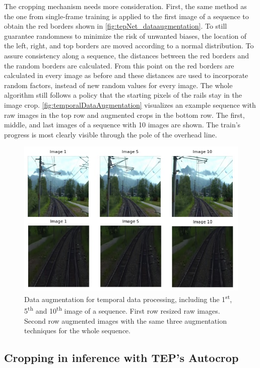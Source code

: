 The cropping mechanism needs more consideration.
First, the same method as the one from single-frame training is applied to the first image of a sequence to obtain the red borders shown in \autoref{fig:tepNet_dataaugmentation}.
To still guarantee randomness to minimize the risk of unwanted biases, the location of the left, right, and top borders are moved according to a normal distribution.
To assure consistency along a sequence, the distances between the red borders and the random borders are calculated.
From this point on the red borders are calculated in every image as before and these distances are used to incorporate random factors, instead of new random values for every image.
The whole algorithm still follows a policy that the starting pixels of the rails stay in the image crop.
\autoref{fig:temporalDataAugmentation} visualizes an example sequence with raw images in the top row and augmented crops in the bottom row.
The first, middle, and last images of a sequence with 10 images are shown.
The train's progress is most clearly visible through the pole of the overhead line. 


\begin{figure}[H]
    \centering
    \includegraphics[width=0.7\linewidth]{PICs//dataAugmentation/temporal_data_augmentation.jpg}
    \caption{Data augmentation for temporal data processing, including the 1\textsuperscript{st}, 5\textsuperscript{th} and 10\textsuperscript{th} image of a sequence. First row resized raw images. Second row augmented images with the same three augmentation techniques for the whole sequence.}
    \label{fig:temporalDataAugmentation}
\end{figure}

\subsection{Cropping in inference with TEP's Autocrop}

